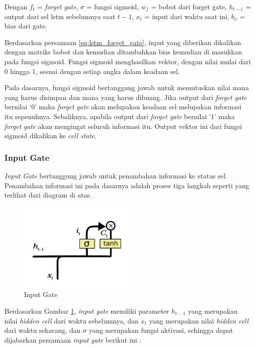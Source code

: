 \documentclass[./skripsi.tex]{subfiles}
\begin{document}
\par Dengan $f_t$ = \textit{forget gate}, $\sigma$ = fungsi sigmoid, $w_f$ = bobot dari forget gate, $h_{t-1}$ = output dari sel lstm sebelumnya saat $t-1$, $x_t$ = input dari waktu saat ini, $b_x$ = bias dari gate.
\par Berdasarkan persamaan \ref{eq:lstm_forget_gate}, input yang diberikan dikalikan dengan matriks bobot dan kemudian ditambahkan bias kemudian di masukkan pada fungsi sigmoid. Fungsi sigmoid menghasilkan vektor, dengan nilai mulai dari 0 hingga 1, sesuai dengan setiap angka dalam keadaan sel. 
\par Pada dasarnya, fungsi sigmoid bertanggung jawab untuk memutuskan nilai mana yang harus disimpan dan mana yang harus dibuang. Jika output dari \textit{forget gate} bernilai ‘0’ maka \textit{forget gate} akan melupakan keadaan sel melupakan informasi itu sepenuhnya. Sebaliknya, apabila output dari \textit{forget gate} bernilai '1' maka \textit{forget gate} akan mengingat seluruh informasi itu. Output vektor ini dari fungsi sigmoid dikalikan ke \textit{cell state}.

\subsubsection{Input Gate}\label{lstm:inputgate}
\par \textit{Input Gate} bertanggung jawab untuk penambahan informasi ke status sel. Penambahan informasi ini pada dasarnya adalah proses tiga langkah seperti yang terlihat dari diagram di atas.

\begin{figure}%
    \centering
    \includegraphics[width=0.5\textwidth]{public/assets/img/InputGate1.png}
    \caption{Input Gate}
    \label{fig:inputgate1.png}
\end{figure}

\par Berdasarkan Gambar \ref{fig:inputgate1.png}, \textit{input gate} memiliki parameter $h_{t-1}$ yang merupakan nilai \textit{hidden cell} dari waktu sebelumnya, dan $x_t$ yang merupakan nilai \textit{hidden cell} dari waktu sekarang, dan $\sigma$ yang merupakan fungsi aktivasi, sehingga dapat dijabarkan persamaan \textit{input gate} berikut ini :
\end{document}
